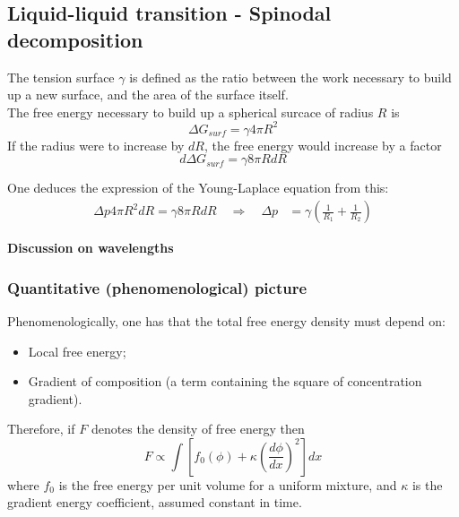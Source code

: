 \documentclass[../phys-f308.tex]{subfiles}
\begin{document}
    \subsection{Liquid-liquid transition - Spinodal decomposition}
    The tension surface $\gamma$ is defined as the ratio between the work necessary to build up a new surface, and the area of the surface itself.\\

    The free energy necessary to build up a spherical surcace of radius $R$ is 
    \begin{equation}
        \Delta G_{surf} = \gamma 4\pi R^2
    \end{equation}
    If the radius were to increase by $dR$, the free energy would increase by a factor
    \begin{equation}
        d\Delta G_{surf} = \gamma 8\pi RdR
    \end{equation}

    One deduces the expression of the Young-Laplace equation from this:
    \begin{align}
        \Delta p4\pi R^2dR = \gamma 8\pi RdR \quad \Rightarrow \quad \Delta p &= \gamma\left(\frac{1}{R_1}+\frac{1}{R_2}\right)
    \end{align}

    \color{red}\textbf{Discussion on wavelengths}\color{black}

    \subsubsection{Quantitative (phenomenological) picture}

    Phenomenologically, one has that the total free energy density must depend on:
    \begin{itemize}
        \item Local free energy;
        \item Gradient of composition (a term containing the square of concentration gradient).
    \end{itemize}

    Therefore, if $F$ denotes the density of free energy then
    \begin{equation}
        F \propto \int \left[f_0(\phi)+\kappa\left(\frac{d\phi}{dx}\right)^2\right]dx
    \end{equation}
    where $f_0$ is the free energy per unit volume for a uniform mixture, and $\kappa$ is the gradient energy coefficient, assumed constant in time.
\end{document}
